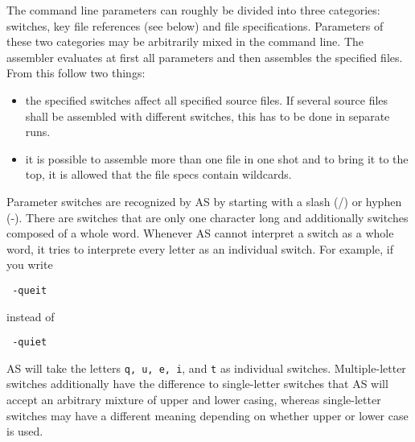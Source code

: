 \documentclass[12pt,twoside]{report}
\newcommand{\tty}[1]{{\tt #1}}
\begin{document}
The command line parameters can roughly be divided into three categories:
switches, key file references (see below) and file specifications.
Parameters of these two categories may be arbitrarily mixed in the command
line.  The assembler evaluates at first all parameters and then assembles
the specified files.  From this follow two things:
\begin{itemize}
\item{the specified switches affect all specified source files. If
      several source files shall be assembled with different switches,
      this has to be done in separate runs.}
\item{it is possible to assemble more than one file in one shot and to
      bring it to the top, it is allowed that the file specs contain
      wildcards.}
\end{itemize}
Parameter switches are recognized by AS by starting with
a slash (/) or hyphen (-).  There are switches that are only one
character long and additionally switches composed of a whole word.
Whenever AS cannot interpret a switch as a whole word, it tries to
interprete every letter as an individual switch.  For example, if you
write
\begin{verbatim}
 -queit
\end{verbatim}
instead of
\begin{verbatim}
 -quiet
\end{verbatim}
AS will take the letters \tty{q, u, e, i}, and \tty{t} as individual
switches.  Multiple-letter switches additionally have the difference to
single-letter switches that AS will accept an arbitrary mixture of upper
and lower casing, whereas single-letter switches may have a different
meaning depending on whether upper or lower case is used.
\end{document}
